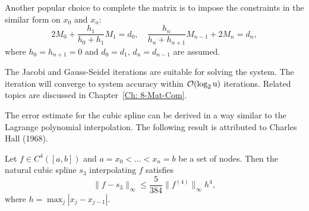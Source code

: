 Another popular choice to complete the matrix is to impose the constraints in the similar form on $x_0$ and $x_n$: 
\begin{equation}
\label{EQ: EXTENSION}
    2M_0 + \frac{h_1}{h_0 + h_1} M_1 = d_0,\quad  \frac{h_n}{h_{n} + h_{n+1}} M_{n-1} + 2M_n = d_n,
\end{equation}
where $h_0 = h_{n+1} = 0$ and $d_0 = d_1$, $d_{n} = d_{n-1}$ are assumed. 
\begin{remark}
The Jacobi and Gauss-Seidel iterations are suitable for solving the system. The iteration will converge to system accuracy within $\mathcal O(\log_2 \textup{u})$ iterations. Related topics are discussed in Chapter~\ref{Ch: 8-Mat-Com}.
\end{remark}
The error estimate for the cubic spline can be derived in a way similar to the Lagrange polynomial interpolation. The following result is attributed to Charles Hall (1968).
\begin{theorem}\label{THM: ERROR CUBIC SPLINE}
    Let $f\in C^4([a, b])$ and $a = x_0 < \dots < x_n = b$ be a set of nodes. Then the natural cubic spline $s_3$ interpolating $f$ satisfies 
    \begin{equation}
        \|f - s_3\|_{\infty} \le \frac{5}{384}\|f^{(4)}\|_{\infty} h^4,
    \end{equation}
    where $h = \max_j |x_j - x_{j-1}|$.
\end{theorem}
